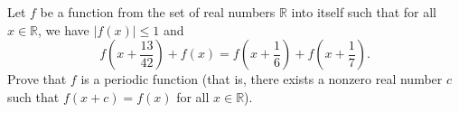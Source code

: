 Let $f$ be a function from the set of real numbers $\mathbb{R}$ into itself such that for all $x \in \mathbb{R}$, we have $|f(x)| \leq 1$ and
\[ f\left(x + \frac{13}{42}\right) + f(x) = f\left(x + \frac{1}{6}\right) + f\left(x + \frac{1}{7}\right). \]
Prove that $f$ is a periodic function (that is, there exists a nonzero real number $c$ such that $f(x+c) = f(x)$ for all $x \in \mathbb{R}$).
